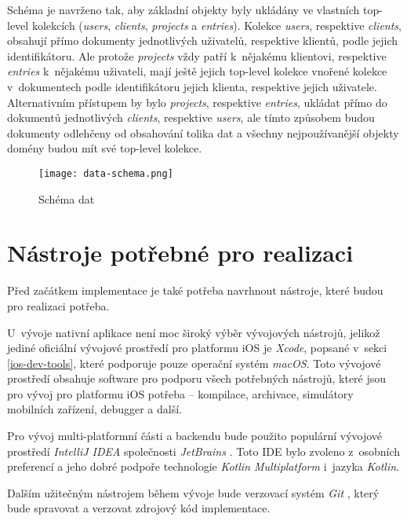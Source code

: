 Schéma je navrženo tak, aby základní objekty byly ukládány ve vlastních top-level kolekcích (\emph{users}, \emph{clients}, \emph{projects} a \emph{entries}). Kolekce \emph{users}, respektive \emph{clients}, obsahují přímo dokumenty jednotlivých uživatelů, respektive klientů, podle jejich identifikátoru. Ale protože \emph{projects} vždy patří k~nějakému klientovi, respektive \emph{entries} k~nějakému uživateli, mají ještě jejich top-level kolekce vnořené kolekce v~dokumentech podle identifikátoru jejich klienta, respektive jejich uživatele. Alternativním přístupem by bylo \emph{projects}, respektive \emph{entries}, ukládat přímo do dokumentů jednotlivých \emph{clients}, respektive \emph{users}, ale tímto způsobem budou dokumenty odlehčeny od obsahování tolika dat a všechny nejpoužívanější objekty domény budou mít své top-level kolekce.

\begin{figure}[h]
	\centering
	\texttt{[image: data-schema.png]}
	\caption{Schéma dat}
	\label{fig:data-schema}
\end{figure}

\section{Nástroje potřebné pro realizaci}\label{dev-tools}

Před začátkem implementace je také potřeba navrhnout nástroje, které budou pro realizaci potřeba.

U~vývoje nativní aplikace není moc široký výběr vývojových nástrojů, jelikož jediné oficiální vývojové prostředí pro platformu iOS je \emph{Xcode}, popsané v~sekci \ref{ios-dev-tools}, které podporuje pouze operační systém \emph{macOS}. Toto vývojové prostředí obsahuje software pro podporu všech potřebných nástrojů, které jsou pro vývoj pro platformu iOS potřeba – kompilace, archivace, simulátory mobilních zařízení, debugger a další.

Pro vývoj multi-platformní části a backendu bude použito populární vývojové prostředí \emph{IntelliJ IDEA} společnosti \emph{JetBrains} \cite{intellij}. Toto IDE bylo zvoleno z~osobních preferencí a jeho dobré podpoře technologie \emph{Kotlin Multiplatform} i~jazyka \emph{Kotlin}.

Dalším užitečným nástrojem během vývoje bude verzovací systém \emph{Git} \cite{git}, který bude spravovat a verzovat zdrojový kód implementace. 





































